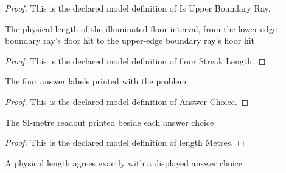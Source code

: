 \begin{proof}
  This is the declared model definition of Is Upper Boundary Ray.
\end{proof}
\begin{definition}
  \label{def:physics:phyx-mini-0048:phyxminiproblems-problemphyxmini0048-floorstreaklength}
  The physical length of the illuminated floor interval, from the lower-edge boundary ray's floor hit to the upper-edge boundary ray's floor hit
\end{definition}
\begin{proof}
  This is the declared model definition of floor Streak Length.
\end{proof}
\begin{definition}
  \label{def:physics:phyx-mini-0048:phyxminiproblems-problemphyxmini0048-answerchoice}
  The four answer labels printed with the problem
\end{definition}
\begin{proof}
  This is the declared model definition of Answer Choice.
\end{proof}
\begin{definition}
  \label{def:physics:phyx-mini-0048:phyxminiproblems-problemphyxmini0048-answerchoice-lengthmetres}
  The SI-metre readout printed beside each answer choice
\end{definition}
\begin{proof}
  This is the declared model definition of length Metres.
\end{proof}
\begin{definition}
  \label{def:physics:phyx-mini-0048:phyxminiproblems-problemphyxmini0048-matchesanswerchoice}
  A physical length agrees exactly with a displayed answer choice
\end{definition}

